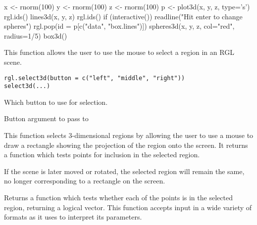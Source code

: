 \documentclass{article}
\begin{document}
\begin{SeeAlso}\relax
{}
\end{SeeAlso}
\begin{Examples}
\begin{ExampleCode}
  x <- rnorm(100)
  y <- rnorm(100)
  z <- rnorm(100)
  p <- plot3d(x, y, z, type='s')
  rgl.ids()
  lines3d(x, y, z)
  rgl.ids()
  if (interactive()) {
    readline("Hit enter to change spheres")
    rgl.pop(id = p[c("data", "box.lines")])
    spheres3d(x, y, z, col="red", radius=1/5)
    box3d()
  }
\end{ExampleCode}
\end{Examples}

\begin{Description}\relax
This function allows the user to use the mouse to
select a region in an RGL scene.
\end{Description}
\begin{Usage}
\begin{verbatim}
rgl.select3d(button = c("left", "middle", "right"))
select3d(...)
\end{verbatim}
\end{Usage}
\begin{Arguments}
\begin{ldescription}
\item[\code{ button }] Which button to use for selection.
\item[\code{ ... }] Button argument to pass to 
\end{ldescription}
\end{Arguments}
\begin{Details}\relax
This function selects 3-dimensional regions by allowing the
user to use a mouse to draw a rectangle showing
the projection of the region onto the screen.  It returns
a function which tests points for inclusion in the selected region.

If the scene is later moved or rotated, the selected region will 
remain the same, no longer corresponding to a rectangle on the screen.
\end{Details}
\begin{Value}
Returns a function  which tests whether each
of the points  is in the selected region, returning
a logical vector.  This function accepts input in a wide
variety of formats as it uses  
to interpret its parameters.
\end{Value}
\end{document}
